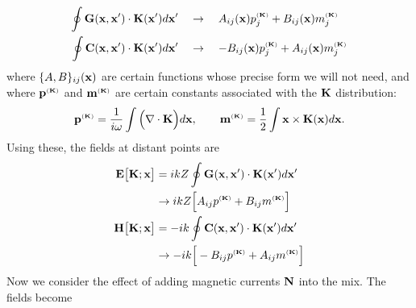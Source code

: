 \documentclass[letterpaper]{article}
\begin{document}
\newcommand{\moment}[2]{#1^{\text{\tiny{($\mathbf{#2}$)}}}}
\begin{align*}
\oint \vb G(\vb x, \vb x^\prime) \cdot \vb K(\vb x^\prime) d\vb x^\prime
 &\quad\to\quad   A_{ij}(\vb x) \moment{p_j}{K}
                + B_{ij}(\vb x) \moment{m_j}{K}
\\
\oint \vb C(\vb x, \vb x^\prime) \cdot \vb K(\vb x^\prime) d\vb x^\prime
 &\quad\to\quad  -B_{ij}(\vb x) \moment{p_j}{K}
                + A_{ij}(\vb x) \moment{m_j}{K}
\end{align*}
where $\{A,B\}_{ij}(\mathbf{x})$ are certain functions whose precise
form we will not need, and where 
$\moment{\vb p}{K}$
and 
$\moment{\vb m}{K}$
are certain constants associated with the $\mathbf{K}$ 
distribution:
$$ \moment{\vb p}{K}
    =\frac{1}{i\omega} \int \Big(\nabla \cdot \vb K\Big)d\vb x, 
   \qquad
   \moment{\vb m}{K}
    =\frac{1}{2} \int \vb x \times \vb K(\vb x) d\vb x.
$$ 
Using these, the fields at distant points are
\begin{align*}
 \vb E\big[\vb K; \vb x\big]
 &= ikZ \oint \vb G(\vb x, \vb x^\prime) \cdot \vb K(\vb x^\prime) d\vb x^\prime
\\
 &\to ikZ \Big[   A_{ij} \moment{p}{K} + B_{ij} \moment{m}{K} \Big]
\\
 \vb H\big[\vb K; \vb x\big]
 &=  -ik\oint \vb C(\vb x, \vb x^\prime) \cdot \vb K(\vb x^\prime) d\vb x^\prime
\\
 &\to -ik\Big[  -B_{ij} \moment{p}{K}
               + A_{ij} \moment{m}{K}
         \Big]
\end{align*}
Now we consider the effect of adding magnetic currents 
$\mathbf{N}$ into the mix. The fields become
\end{document}
